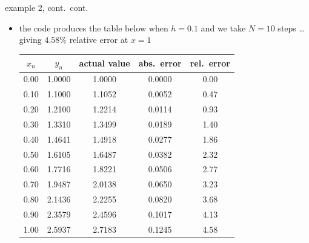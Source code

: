 \documentclass{beamer}
\begin{document}
\begin{frame}{example 2, cont.~cont.}

\begin{itemize}
\item the code produces the table below when $h=0.1$ and we take $N=10$ steps \dots giving $4.58\%$ relative error at $x=1$

\medskip
\footnotesize
\begin{tabular}{ccccc}
$x_n$ & $y_n$ & actual value & abs.~error & rel.~error \\ \hline
0.00 & 1.0000 & 1.0000 & 0.0000 & 0.00 \\
0.10 & 1.1000 & 1.1052 & 0.0052 & 0.47 \\
0.20 & 1.2100 & 1.2214 & 0.0114 & 0.93 \\
0.30 & 1.3310 & 1.3499 & 0.0189 & 1.40 \\
0.40 & 1.4641 & 1.4918 & 0.0277 & 1.86 \\
0.50 & 1.6105 & 1.6487 & 0.0382 & 2.32 \\
0.60 & 1.7716 & 1.8221 & 0.0506 & 2.77 \\
0.70 & 1.9487 & 2.0138 & 0.0650 & 3.23 \\
0.80 & 2.1436 & 2.2255 & 0.0820 & 3.68 \\
0.90 & 2.3579 & 2.4596 & 0.1017 & 4.13 \\
1.00 & 2.5937 & 2.7183 & 0.1245 & 4.58
\end{tabular}
\end{itemize}
\end{frame}
\end{document}
